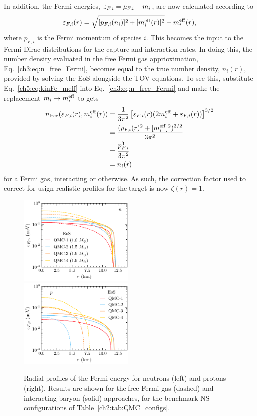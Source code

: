 In addition, the Fermi energies, $\varepsilon_{F,i} = \mu_{F,i} - m_i$, are now calculated according to 
\begin{equation}
   \varepsilon_{F,i}(r) = \sqrt{[p_{F,i}(n_i)]^2 + [m_i^{\rm eff}(r)]^2} - m_i^{\rm eff}(r),
   \label{ch5:eq:kinFe_meff}
\end{equation}
where $p_{F,i}$ is the Fermi momentum of species $i$. This becomes the input to the Fermi-Dirac distributions for the capture and interaction rates. In doing this, the number density evaluated in the free Fermi gas apprioximation, Eq.~\ref{ch3:eq:n_free_Fermi}, becomes equal to the true number density, $n_i(r)$, provided by solving the EoS alongside the TOV equations. To see this, substitute Eq.~\ref{ch5:eq:kinFe_meff} into Eq.~\ref{ch3:eq:n_free_Fermi} and make the replacement $m_i\rightarrow m_i^{\rm eff}$ to gets
\begin{align}
   n_\mathrm{free}(\varepsilon_{F,i}(r), m_i^{\rm eff}(r)) & = \frac{1}{3\pi^2}\left[ \varepsilon_{F,i}(r)(2m_i^{\rm eff} + \varepsilon_{F,i}(r))\right]^{3/2}\\
   & = \frac{(p_{F,i}(r)^2 + [m_i^{\rm eff}]^2)^{3/2}}{3\pi^2}\\
   & = \frac{p_{F, i}^3}{3\pi^2}\\
   & = n_i(r)
\end{align}
for a Fermi gas, interacting or otherwise. 
As such, the correction factor used to correct for usign realistic profiles for the target is now $\zeta(r) = 1$.


\begin{figure}[t!bp]
   \centering
\includegraphics[width=0.495\textwidth]{capture_3/muFn_meff_r_QMC.pdf}
\includegraphics[width=0.495\textwidth]{capture_3/muFp_meff_r_QMC.pdf}
   \caption{Radial profiles of the Fermi energy for neutrons (left) and protons (right). Results are shown for the free Fermi gas (dashed) and interacting baryon (solid) approaches, for the benchmark NS configurations of Table~\ref{ch2:tab:QMC_configs}.
   }
   \label{ch5:fig:muradprofs}
\end{figure}

